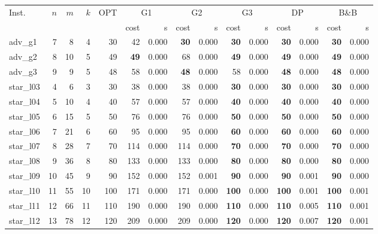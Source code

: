 \begin{longtable}{@{}lrrrr@{\hspace{9pt}}rr@{\hspace{9pt}}rr@{\hspace{9pt}}rr@{\hspace{9pt}}rr@{\hspace{9pt}}rr@{}}\toprule
Inst. & \(n\) & \(m\) & \(k\) & OPT & \multicolumn{2}{c}{G1} & \multicolumn{2}{c}{G2} & \multicolumn{2}{c}{G3} & \multicolumn{2}{c}{DP} & \multicolumn{2}{c}{B\&B}\\
\cmidrule(l{6pt}){6-7}\cmidrule(l{6pt}){8-9}\cmidrule(l{6pt}){10-11}\cmidrule(l{6pt}){12-13}\cmidrule(l{6pt}){14-15}
 & & & & & cost & s & cost & s & cost & s & cost & s & cost & s\\\midrule\endhead
adv\_g1 & 7 & 8 & 4 & 30 & 42 & 0.000 & \textbf{30} & 0.000 & \textbf{30} & 0.000 & \textbf{30} & 0.000 & \textbf{30} & 0.000\\
adv\_g2 & 8 & 10 & 5 & 49 & \textbf{49} & 0.000 & 68 & 0.000 & \textbf{49} & 0.000 & \textbf{49} & 0.000 & \textbf{49} & 0.000\\
adv\_g3 & 9 & 9 & 5 & 48 & 58 & 0.000 & \textbf{48} & 0.000 & 58 & 0.000 & \textbf{48} & 0.000 & \textbf{48} & 0.000\\
star\_l03 & 4 & 6 & 3 & 30 & 38 & 0.000 & 38 & 0.000 & \textbf{30} & 0.000 & \textbf{30} & 0.000 & \textbf{30} & 0.000\\
star\_l04 & 5 & 10 & 4 & 40 & 57 & 0.000 & 57 & 0.000 & \textbf{40} & 0.000 & \textbf{40} & 0.000 & \textbf{40} & 0.000\\
star\_l05 & 6 & 15 & 5 & 50 & 76 & 0.000 & 76 & 0.000 & \textbf{50} & 0.000 & \textbf{50} & 0.000 & \textbf{50} & 0.000\\
star\_l06 & 7 & 21 & 6 & 60 & 95 & 0.000 & 95 & 0.000 & \textbf{60} & 0.000 & \textbf{60} & 0.000 & \textbf{60} & 0.000\\
star\_l07 & 8 & 28 & 7 & 70 & 114 & 0.000 & 114 & 0.000 & \textbf{70} & 0.000 & \textbf{70} & 0.000 & \textbf{70} & 0.000\\
star\_l08 & 9 & 36 & 8 & 80 & 133 & 0.000 & 133 & 0.000 & \textbf{80} & 0.000 & \textbf{80} & 0.000 & \textbf{80} & 0.000\\
star\_l09 & 10 & 45 & 9 & 90 & 152 & 0.000 & 152 & 0.001 & \textbf{90} & 0.000 & \textbf{90} & 0.001 & \textbf{90} & 0.000\\
star\_l10 & 11 & 55 & 10 & 100 & 171 & 0.000 & 171 & 0.000 & \textbf{100} & 0.000 & \textbf{100} & 0.001 & \textbf{100} & 0.001\\
star\_l11 & 12 & 66 & 11 & 110 & 190 & 0.000 & 190 & 0.000 & \textbf{110} & 0.000 & \textbf{110} & 0.005 & \textbf{110} & 0.001\\
star\_l12 & 13 & 78 & 12 & 120 & 209 & 0.000 & 209 & 0.000 & \textbf{120} & 0.000 & \textbf{120} & 0.007 & \textbf{120} & 0.001\\
\bottomrule\end{longtable}\endgroup
